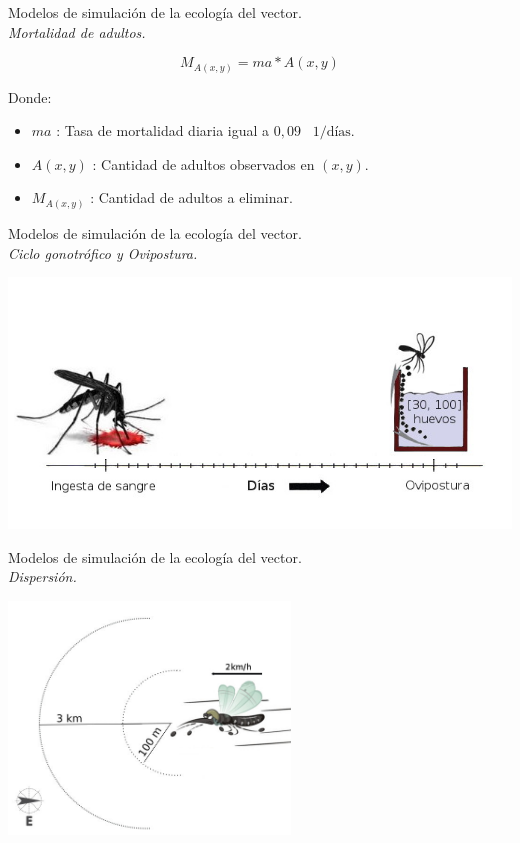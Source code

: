 \begin{frame}[c]{Modelos de simulación de la ecología del vector.\\\textit{Mortalidad de adultos.}}
  \begin{center}
    \begin{equation}
        M_{A(x,y)} = ma * A(x,y)
    \end{equation}
  \end{center}
  Donde:
    \begin{itemize}
      \item $ma$ : Tasa de mortalidad diaria igual a $0,09$ \ $1/\text{días}$.
      \item $A(x, y)$ : Cantidad de adultos observados en $(x,y)$.
      \item $M_{A(x,y)}$ : Cantidad de adultos a eliminar.
    \end{itemize}
\end{frame}


\begin{frame}[c]{Modelos de simulación de la ecología del vector.\\\textit{Ciclo gonotrófico y Ovipostura.}}
  \begin{center}
      \includegraphics[width=\textwidth]{./graphics/cliclo-gonotrofico-tiempo.jpg}
  \end{center}
\end{frame}

\begin{frame}[t]{Modelos de simulación de la ecología del vector.\\\textit{Dispersión.}}
  \begin{center}
    \includegraphics[width=7.5cm]{./graphics/dispersion.jpg}
  \end{center}
\end{frame}

